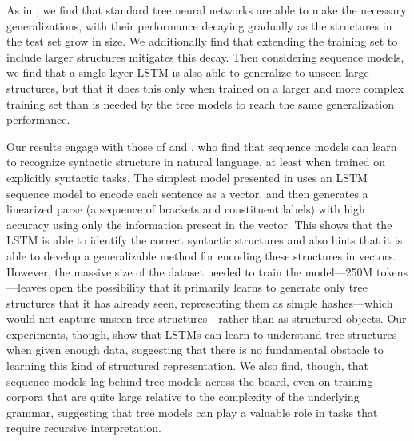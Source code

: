 As in \cite{Bowman:Potts:Manning:2014}, we find that standard tree neural networks are able to make the necessary generalizations, with their performance decaying gradually as the structures in the test set grow in size. We additionally find that extending the training set to include larger structures mitigates this decay. Then considering sequence models, we find that a single-layer LSTM is also able to generalize to unseen large structures, but that it does this only when trained on a larger and more complex training set than is needed by the tree models to reach the same generalization performance.

Our results engage with those of \cite{vinyals2014grammar} and \cite{dyer2015transition}, who find that sequence models can learn to recognize syntactic structure in natural language, at least when trained on explicitly syntactic tasks. The simplest model presented in \cite{vinyals2014grammar} uses an LSTM sequence model to encode each sentence as a vector, and then generates a linearized parse (a sequence of brackets and constituent labels) with high accuracy using only the information present in the vector. This shows that the LSTM is able to identify the correct syntactic structures and also hints that it is able to develop a generalizable method for encoding these structures in vectors. However, the massive size of the dataset needed to train the model---250M tokens---leaves open the possibility that it primarily learns to generate only tree structures that it has already seen, representing them as simple hashes---which would not capture unseen tree structures---rather than as structured objects.
Our experiments, though, show that LSTMs can learn to understand tree structures when given enough data, suggesting that there is no fundamental obstacle to learning this kind of structured representation. We also find, though, that sequence models lag behind tree models across the board, even on training corpora that are quite large relative to the complexity of the underlying grammar, suggesting that tree models can play a valuable role in tasks that require recursive interpretation.
